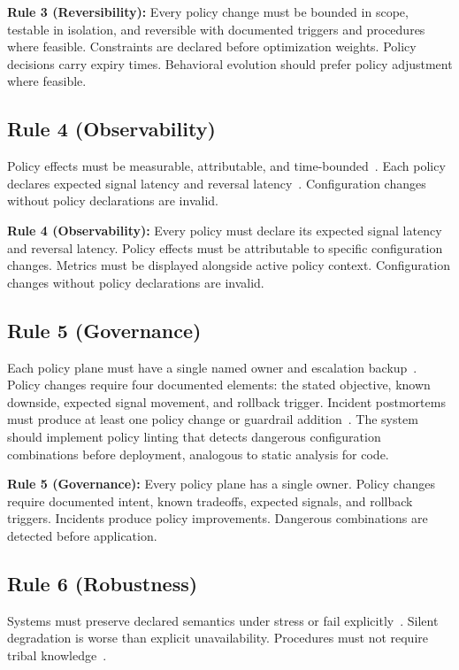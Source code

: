 \documentclass[conference]{IEEEtran}
\begin{document}
\noindent\textbf{Rule 3 (Reversibility):} Every policy change must be bounded in scope, testable in isolation, and reversible with documented triggers and procedures where feasible. Constraints are declared before optimization weights. Policy decisions carry expiry times. Behavioral evolution should prefer policy adjustment where feasible.


\subsection{Rule 4 (Observability)}
Policy effects must be measurable, attributable, and time-bounded~\cite{observability2026}. Each policy declares expected signal latency and reversal latency~\cite{controltheory}. Configuration changes without policy declarations are invalid.

\noindent\textbf{Rule 4 (Observability):} Every policy must declare its expected signal latency and reversal latency. Policy effects must be attributable to specific configuration changes. Metrics must be displayed alongside active policy context. Configuration changes without policy declarations are invalid.

\subsection{Rule 5 (Governance)}


Each policy plane must have a single named owner and escalation backup~\cite{leveson,pourmajidi2025governance,cncf2023policy,cncf2023governance}. Policy changes require four documented elements: the stated objective, known downside, expected signal movement, and rollback trigger. Incident postmortems must produce at least one policy change or guardrail addition~\cite{sre}. The system should implement policy linting that detects dangerous configuration combinations before deployment, analogous to static analysis for code.

\noindent\textbf{Rule 5 (Governance):} Every policy plane has a single owner. Policy changes require documented intent, known tradeoffs, expected signals, and rollback triggers. Incidents produce policy improvements. Dangerous combinations are detected before application.


\subsection{Rule 6 (Robustness)}
Systems must preserve declared semantics under stress or fail explicitly~\cite{corbato1972,leveson}. Silent degradation is worse than explicit unavailability. Procedures must not require tribal knowledge~\cite{dijkstra1972humble,simon}.
\end{document}
